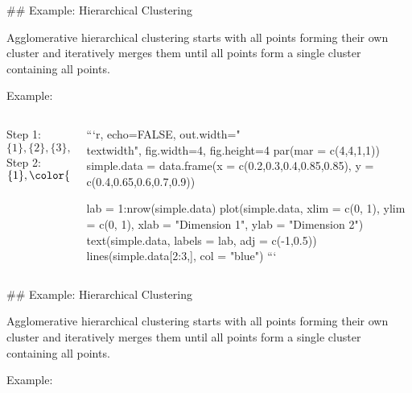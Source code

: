 ## Example: Hierarchical Clustering

\addtocounter{framenumber}{-1}

Agglomerative hierarchical clustering starts with all points forming their own cluster and iteratively merges them until all points form a single cluster containing all points.

Example:

\begin{columns}

\begin{column}{0.5\textwidth}
Step 1: $\{1\},\{2\},\{3\},\{4\},\{5\}$\\
Step 2: $\{1\},{\color{blue}\{2,3\}},\{4\},\{5\}$ \\
\end{column}
\begin{column}{0.4\textwidth}

```{r, echo=FALSE, out.width="\\textwidth", fig.width=4, fig.height=4}
par(mar = c(4,4,1,1))
simple.data = data.frame(x = c(0.2,0.3,0.4,0.85,0.85),
  y = c(0.4,0.65,0.6,0.7,0.9))

lab = 1:nrow(simple.data)
plot(simple.data, xlim = c(0, 1), ylim = c(0, 1), xlab = "Dimension 1", ylab = "Dimension 2")
text(simple.data, labels = lab, adj = c(-1,0.5))
lines(simple.data[2:3,], col = "blue")
```

\end{column}
\end{columns}


## Example: Hierarchical Clustering

\addtocounter{framenumber}{-1}

Agglomerative hierarchical clustering starts with all points forming their own cluster and iteratively merges them until all points form a single cluster containing all points.

Example:

